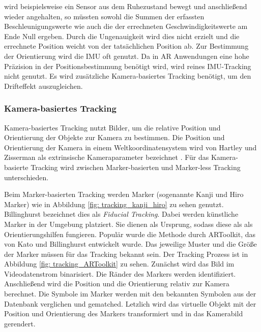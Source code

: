 \glqq [..] wird beispielsweise ein Sensor aus dem Ruhezustand bewegt und anschließend wieder angehalten, so müssten sowohl die Summen der erfassten Beschleunigungswerte wie auch die der errechneten Geschwindigkeitswerte am Ende Null ergeben\grqq{}\cite*[Dörner (2019) S.127f.,][]{doerner}. 
Durch die Ungenauigkeit wird dies nicht erzielt und die errechnete Position weicht von der tatsächlichen Position ab. Zur Bestimmung der Orientierung wird die IMU oft genutzt. Da in AR Anwendungen eine hohe Präzision in der Positionsbestimmung benötigt wird, wird reines IMU-Tracking nicht genutzt. Es wird zusätzliche Kamera-basiertes Tracking benötigt, um den Drifteffekt auszugleichen\cite[Billinghurst (2015),][]{billinghurst2015}.

\subsubsection{Kamera-basiertes Tracking}
\label{tracking-kamerabasiertes-tracking}
Kamera-basiertes Tracking nutzt Bilder, um die relative Position und Orientierung der Objekte zur Kamera zu bestimmen. Die Position und Orientierung der Kamera in einem Weltkoordinatensystem wird von Hartley und Zisserman als extrinsische Kameraparameter bezeichnet \cite*[Hartley, Zisserman (2003) S.156,][]{hartleyzisserman}. Für das Kamera-basierte Tracking wird zwischen Marker-basierten und Marker-less Tracking unterschieden.

Beim Marker-basierten Tracking werden Marker (sogenannte Kanji und Hiro Marker) wie in Abbildung \ref{fig: tracking_kanji_hiro} zu sehen genutzt. Billinghurst\cite[][]{billinghurst2015} bezeichnet dies als \textit{Fiducial Tracking}. Dabei werden künstliche Marker in der Umgebung platziert. Sie dienen als Ursprung, sodass diese als als Orientierungshilfen fungieren. Populär wurde die Methode durch ARToolkit, das von Kato und Billinghurst\cite[(1999),][]{kato1999} entwickelt wurde. Das jeweilige Muster und die Größe der Marker müssen für das Tracking bekannt sein. Der Tracking Prozess ist in Abbildung \ref*{fig: tracking_ARToolkit} zu sehen. Zunächst wird das Bild im Videodatenstrom binarisiert. Die Ränder des Markers werden identifiziert. Anschließend wird die Position und die Orientierung relativ zur Kamera berechnet. Die Symbole im Marker werden mit den bekannten Symbolen aus der Datenbank verglichen und gematched. Letzlich wird  das virtuelle Objekt mit der Position und Orientierung des Markers transformiert und in das Kamerabild gerendert.

